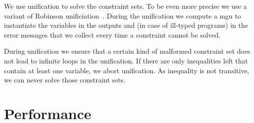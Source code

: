 We use unification to solve the constraint sets. To be even more
precise we use a variant of Robinson
unificiation~\cite{robinson1965machine}. During the unification we
compute a \gls{mgu} to instantiate the variables in the outputs and
(in case of ill-typed programs) in the error messages that we collect
every time a constraint cannot be solved.

During unification we ensure that a certain kind of malformed
constraint set does not lead to infinite loops in the unification. If
there are only inequalities left that contain at least one variable,
we abort unification. As inequality is not transitive, we can never
solve those constraint sets.
\section{Performance}
\label{sec:performance}


